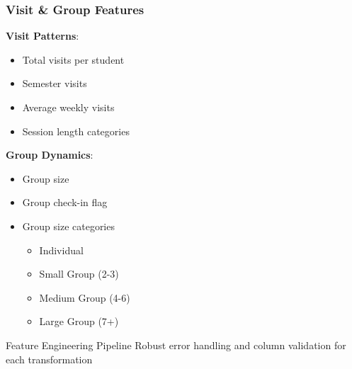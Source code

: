 \documentclass{beamer}
\begin{document}
\begin{frame}
\frametitle{Visit \& Group Features}
    \textbf{Visit Patterns}:
        \begin{itemize}
        \item Total visits per student
        \item Semester visits
        \item Average weekly visits
        \item Session length categories
        \end{itemize}
    
    \textbf{Group Dynamics}:
        \begin{itemize}
        \item Group size
        \item Group check-in flag
        \item Group size categories
            \begin{itemize}
            \item Individual
            \item Small Group (2-3)
            \item Medium Group (4-6)
            \item Large Group (7+)
            \end{itemize}
        \end{itemize}

    \begin{alertblock}{Feature Engineering Pipeline}
        Robust error handling and column validation for each transformation
    \end{alertblock}
\end{frame}
\end{document}

